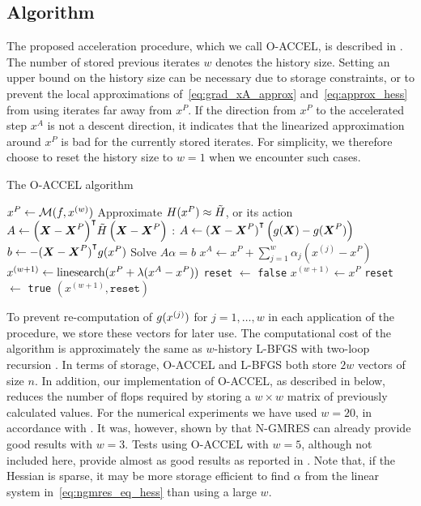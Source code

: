 \documentclass[main.tex]{subfiles}
\begin{document}
\subsection{Algorithm}
The proposed acceleration procedure, which we call O-ACCEL, is
described in .  The number of stored previous
iterates $w$ denotes the history size.  Setting an upper bound on the
history size can be necessary due to storage constraints, or to
prevent the local approximations of~\eqref{eq:grad_xA_approx}
and~\eqref{eq:approx_hess} from using iterates far away from $x^P$. If
the direction from $x^P$ to the accelerated step $x^A$ is not a
descent direction, it indicates that the linearized approximation
around $x^P$ is bad for the currently stored iterates.  For
simplicity, we therefore choose to reset the history size to $w=1$
when we encounter such cases.
\begin{algorithm}[htb]
  \caption{The O-ACCEL algorithm}\label{alg:ngmreso}
  \begin{algorithmic}[1]
    \State $x^P\gets \mathcal{M}(f,x^{(w)})$
    \State Approximate $H(x^P)\approx \tilde{H}$, or
    its action
    \State $A\gets
    {\left(\boldsymbol{X}-\boldsymbol{X}^P\right)}^\intercal\tilde{H}
    \left(\boldsymbol{X}-\boldsymbol{X}^P\right)$
    \hfill {\footnotesize {}: $A\gets{(\boldsymbol{X}-\boldsymbol{X}^P)}^\intercal\left(
        g(\boldsymbol{X})-g(\boldsymbol{X}^P)
      \right)$}
    \State $b\gets -{(\boldsymbol{X}-\boldsymbol{X}^P)}^\intercal{g(x^P)}$
    \State Solve  $A\alpha = b$
    \State $x^A \gets x^P + \sum_{j=1}^w\alpha_j(x^{(j)}-x^P)$
    \label{algline:descent_dir}
    \State $x^{(w+1)}\gets \textnormal{linesearch}(x^P+\lambda(x^A-x^P))$\label{algli:xp_xa_ls}
    \State \texttt{reset} $\gets$ \texttt{false}
    \Else
    \State $x^{(w+1)}\gets x^P$
    \State \texttt{reset} $\gets$ \texttt{true}
    \EndIf
    \State \Return $(x^{(w+1)},\texttt{reset})$
    \EndProcedure
  \end{algorithmic}
\end{algorithm}

To prevent re-computation of $g(x^{(j)})$ for $j=1,\dots,w$ in
each application of the procedure, we store these vectors for later
use.  The computational cost of the algorithm is approximately the
same as $w$-history L-BFGS with two-loop recursion
\citep{sterck2013steepest}. %
In terms of storage, O-ACCEL and L-BFGS both store $2w$ vectors of
size $n$. In addition, our implementation of O-ACCEL, as described in
 below, reduces the number of flops required by
storing a $w\times w$ matrix of previously calculated values. For the
numerical experiments we have used $w=20$, in accordance with
\citet{sterck2013steepest}.  It was, however, shown by
\citet{sterck2013steepest} that N-GMRES can already provide good
results with $w=3$.  Tests using O-ACCEL with $w=5$, although not
included here, provide almost as good results as reported in
.  Note that, if the Hessian is sparse, it
may be more storage efficient to find $\alpha$ from the linear system
in~\eqref{eq:ngmres_eq_hess} than using a large $w$.
\end{document}
